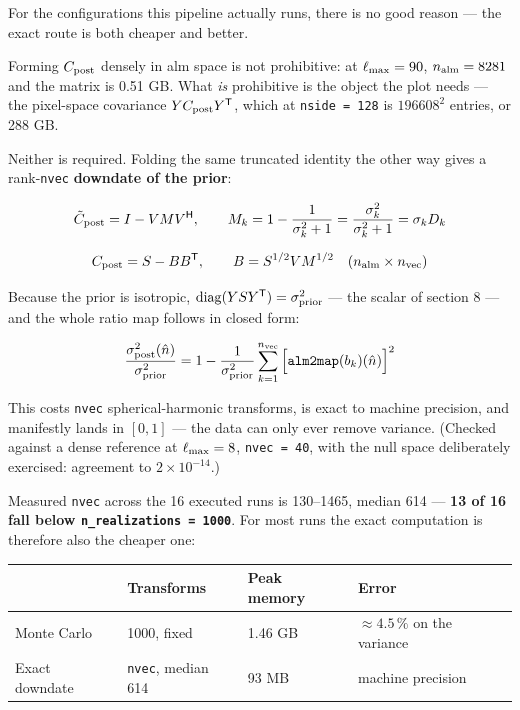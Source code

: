 \documentclass[
  11pt,
]{article}
\begin{document}
For the configurations this pipeline actually runs, there is no good
reason --- the exact route is both cheaper and better.

Forming \(C_{\rm post}\) densely in alm space is not prohibitive: at
\(\ell_{\rm max} = 90\), \(n_{\rm alm} = 8281\) and the matrix is 0.51
GB. What \emph{is} prohibitive is the object the plot needs --- the
pixel-space covariance \(Y C_{\rm post} Y^{\mathsf T}\), which at
\texttt{nside\ =\ 128} is \(196608^2\) entries, or 288 GB.

Neither is required. Folding the same truncated identity the other way
gives a rank-\texttt{nvec} \textbf{downdate of the prior}:

\[ \tilde{C}_{\rm post} = I - VMV^{\mathsf H}, \qquad M_k = 1 - \frac{1}{\sigma_k^2+1} = \frac{\sigma_k^2}{\sigma_k^2+1} = \sigma_k D_k \]

\[ C_{\rm post} = S - BB^{\mathsf T}, \qquad B = S^{1/2}VM^{1/2} \quad (n_{\rm alm} \times n_{\rm vec}) \]

Because the prior is isotropic,
\(\mathrm{diag}(YSY^{\mathsf T}) = \sigma^2_{\rm prior}\) --- the scalar
of section 8 --- and the whole ratio map follows in closed form:

\[ \frac{\sigma^2_{\rm post}(\hat{n})}{\sigma^2_{\rm prior}} = 1 - \frac{1}{\sigma^2_{\rm prior}}\sum_{k=1}^{n_{\rm vec}} \Big[\texttt{alm2map}(b_k)(\hat{n})\Big]^2 \]

This costs \texttt{nvec} spherical-harmonic transforms, is exact to
machine precision, and manifestly lands in \([0, 1]\) --- the data can
only ever remove variance. (Checked against a dense reference at
\(\ell_{\rm max} = 8\), \texttt{nvec\ =\ 40}, with the null space
deliberately exercised: agreement to \(2 \times 10^{-14}\).)

Measured \texttt{nvec} across the 16 executed runs is 130--1465, median
614 --- \textbf{13 of 16 fall below \texttt{n\_realizations\ =\ 1000}}.
For most runs the exact computation is therefore also the cheaper one:

\begin{longtable}[]{@{}llll@{}}
\toprule\noalign{}
& Transforms & Peak memory & Error \\
\midrule\noalign{}
\endhead
\bottomrule\noalign{}
\endlastfoot
Monte Carlo & 1000, fixed & 1.46 GB & \(\approx 4.5\,\%\) on the
variance \\
Exact downdate & \texttt{nvec}, median 614 & 93 MB & machine
precision \\
\end{longtable}
\end{document}
